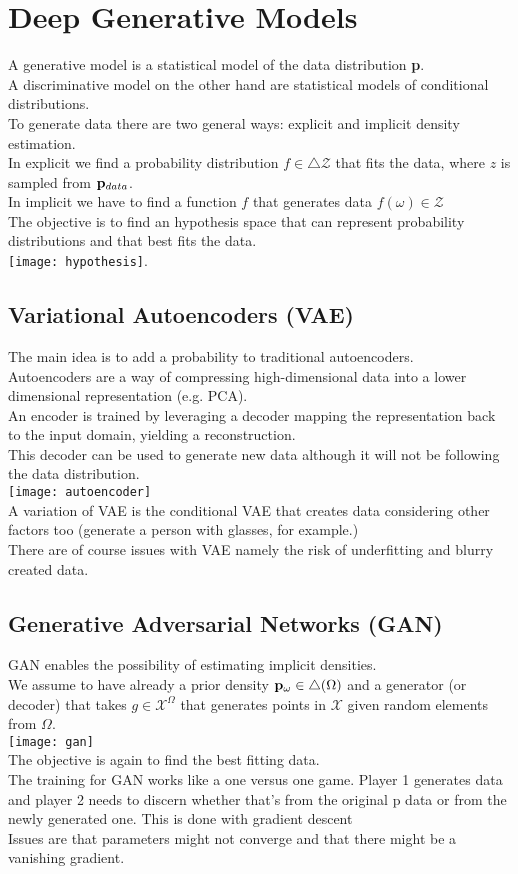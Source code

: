 \chapter{Deep Generative Models}

A generative model is a statistical model of the data distribution {\bf p}. \\
A discriminative model on the other hand are statistical models of conditional distributions.\\
To generate data there are two general ways: explicit and implicit density estimation. \\
In explicit we find a probability distribution $f \in \triangle{\mathscr{Z}}$ that fits the data, where $z$ is sampled from ${\bf p}_{data}$. \\
In implicit we have to find a function $f$ that generates data $f(\omega) \in \mathscr{Z}$\\
The objective is to find an hypothesis space that can represent probability distributions and that best fits the data.\\
\texttt{[image: hypothesis]}.
\section{Variational Autoencoders (VAE)}
The main idea is to add a probability to traditional autoencoders.\\
Autoencoders are a way of compressing high-dimensional data into a lower dimensional representation (e.g. PCA).\\
An encoder is trained by leveraging a decoder mapping the representation back to the input domain, yielding a reconstruction. \\
This decoder can be used to generate new data although it will not be following the data distribution. \\
\texttt{[image: autoencoder]}\\
A variation of VAE is the conditional VAE that creates data considering other factors too (generate a person with glasses, for example.)\\
There are of course issues with VAE namely the risk of underfitting and blurry created data. 
\section{Generative Adversarial Networks (GAN)}
GAN enables the possibility of estimating implicit densities. \\
We assume to have already a prior density ${\bf p}_\omega \in \triangle(\Omega)$ and a generator (or decoder) that takes $g\in \mathscr{X}^\Omega$ that generates points in $\mathscr{X}$ given random elements from $\Omega$. \\
\texttt{[image: gan]} \\
The objective is again to find the best fitting data.\\
The training for GAN works like a one versus one game. Player 1 generates data and player 2 needs to discern whether that's from the original p data or from the newly generated one. This is done with gradient descent \\
Issues are that parameters might not converge and that there might be a vanishing gradient. 